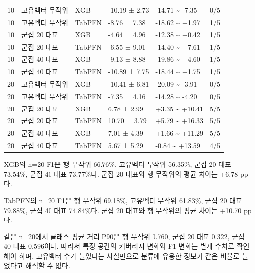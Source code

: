 \begin{longtable}
{}10 & 고유벡터 무작위 & XGB & -10.19 ± 2.73 & -14.71 \textasciitilde{} -7.35 & 0/\allowbreak{}5 \\
{}10 & 고유벡터 무작위 & TabPFN & -8.76 ± 7.38 & -18.62 \textasciitilde{} +\allowbreak{}1.97 & 1/\allowbreak{}5 \\
{}10 & 군집 20 대표 & XGB & -4.64 ± 4.96 & -12.38 \textasciitilde{} +\allowbreak{}0.42 & 1/\allowbreak{}5 \\
{}10 & 군집 20 대표 & TabPFN & -6.55 ± 9.01 & -14.40 \textasciitilde{} +\allowbreak{}7.61 & 1/\allowbreak{}5 \\
{}10 & 군집 40 대표 & XGB & -9.13 ± 8.88 & -19.86 \textasciitilde{} +\allowbreak{}4.60 & 1/\allowbreak{}5 \\
{}10 & 군집 40 대표 & TabPFN & -10.89 ± 7.75 & -18.44 \textasciitilde{} +\allowbreak{}1.75 & 1/\allowbreak{}5 \\
{}20 & 고유벡터 무작위 & XGB & -10.41 ± 6.81 & -20.09 \textasciitilde{} -3.91 & 0/\allowbreak{}5 \\
{}20 & 고유벡터 무작위 & TabPFN & -7.35 ± 4.16 & -14.28 \textasciitilde{} -4.20 & 0/\allowbreak{}5 \\
{}20 & 군집 20 대표 & XGB & 6.78 ± 2.99 & +\allowbreak{}3.35 \textasciitilde{} +\allowbreak{}10.41 & 5/\allowbreak{}5 \\
{}20 & 군집 20 대표 & TabPFN & 10.70 ± 3.79 & +\allowbreak{}5.79 \textasciitilde{} +\allowbreak{}16.33 & 5/\allowbreak{}5 \\
{}20 & 군집 40 대표 & XGB & 7.01 ± 4.39 & +\allowbreak{}1.66 \textasciitilde{} +\allowbreak{}11.29 & 5/\allowbreak{}5 \\
{}20 & 군집 40 대표 & TabPFN & 5.67 ± 5.29 & -0.84 \textasciitilde{} +\allowbreak{}13.59 & 4/\allowbreak{}5 \\
\bottomrule
\end{longtable}
\endgroup
XGB의 n=\allowbreak{}20 F1은 행 무작위 66.76\%, 고유벡터 무작위 56.35\%, 군집 20 대표 73.54\%, 군집 40 대표 73.77\%다. 군집 20 대표와 행 무작위의 평균 차이는 +\allowbreak{}6.78 pp다.

TabPFN의 n=\allowbreak{}20 F1은 행 무작위 69.18\%, 고유벡터 무작위 61.83\%, 군집 20 대표 79.88\%, 군집 40 대표 74.84\%다. 군집 20 대표와 행 무작위의 평균 차이는 +\allowbreak{}10.70 pp다.

같은 n=\allowbreak{}20에서 클래스 평균 거리 P90은 행 무작위 0.760, 군집 20 대표 0.322, 군집 40 대표 0.596이다. 따라서 특징 공간의 커버리지 변화와 F1 변화는 별개 수치로 확인해야 하며, 고유벡터 수가 늘었다는 사실만으로 분류에 유용한 정보가 같은 비율로 늘었다고 해석할 수 없다.

